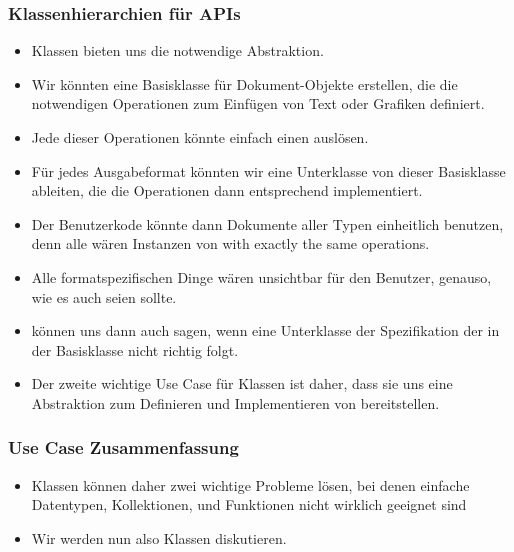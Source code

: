 \documentclass[aspectratio=169,mathserif,notheorems]{beamer}%
\begin{document}
%
\begin{frame}%
\frametitle{Klassenhierarchien für APIs}%
\begin{itemize}%
\item Klassen bieten uns die notwendige Abstraktion.%
%
\item<2-> Wir könnten eine Basisklasse  für Dokument-Objekte erstellen, die die notwendigen Operationen zum Einfügen von Text oder Grafiken definiert.%
%
\item<3-> Jede dieser Operationen könnte einfach einen  auslösen.%
%
\item<4-> Für jedes Ausgabeformat könnten wir eine Unterklasse von dieser Basisklasse ableiten, die die Operationen dann entsprechend implementiert.%
%
\item<5-> Der Benutzerkode könnte dann Dokumente aller Typen einheitlich benutzen, denn alle wären Instanzen von  with exactly the same operations.%
%
\item<6-> Alle formatspezifischen Dinge wären unsichtbar für den Benutzer, genauso, wie es auch seien sollte.%
%
\item<7->  können uns dann auch sagen, wenn eine Unterklasse der Spezifikation der  in der Basisklasse nicht richtig folgt.%
%
\item<8-> Der zweite wichtige Use Case für Klassen ist daher, dass sie uns eine Abstraktion zum Definieren und Implementieren von  bereitstellen.%
\end{itemize}%
\end{frame}%
%
\begin{frame}%
\frametitle{Use Case Zusammenfassung}%
\begin{itemize}%
\item Klassen können daher zwei wichtige Probleme lösen, bei denen einfache Datentypen, Kollektionen, und Funktionen nicht wirklich geeignet sind%
%
\item<4-> Wir werden nun also Klassen diskutieren.%
\end{itemize}%
\end{frame}%
%
\end{document}
